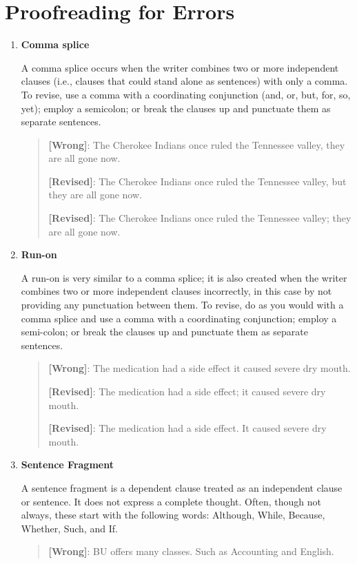 
 
\chapter{Proofreading for Errors}

\begin{enumerate}

\item \textbf{Comma splice}

A comma splice occurs when the writer combines two or more independent clauses 
(i.e., clauses that could stand alone as sentences) with only a comma. To revise, use a 
comma with a coordinating conjunction (and, or, but, for, so, yet); employ a semicolon; 
or break the clauses up and punctuate them as separate sentences.
\begin{quote}
\textbf{[Wrong]}: The Cherokee Indians once ruled the Tennessee valley, they are all 
gone now.

\textbf{[Revised]}:  The Cherokee Indians once ruled the Tennessee valley, but they are 
all gone now.

\textbf{[Revised]}: The Cherokee Indians once ruled the Tennessee valley; they are all 
gone now.
\end{quote}
\item \textbf{Run-on}

A run-on is very similar to a comma splice; it is also created when the writer combines 
two or more independent clauses incorrectly, in this case by not providing any 
punctuation between them.  To revise, do as you would with a comma splice and use a 
comma with a coordinating conjunction; employ a semi-colon; or break the clauses up 
and punctuate them as separate sentences.
\begin{quote}
\textbf{[Wrong]}: The medication had a side effect it caused severe dry mouth.

\textbf{[Revised]}: The medication had a side effect; it caused severe dry mouth.

\textbf{[Revised]}: The medication had a side effect. It caused severe dry mouth.
\end{quote}
\item \textbf{Sentence Fragment}

A sentence fragment is a dependent clause treated as an independent clause or 
sentence. It does not express a complete thought. Often, though not always, these 
start with the following words: Although, While, Because, Whether, Such, and If.
\begin{quote}
\textbf{[Wrong]}: BU offers many classes. Such as Accounting and English.


\end{quote}
\end{enumerate}

